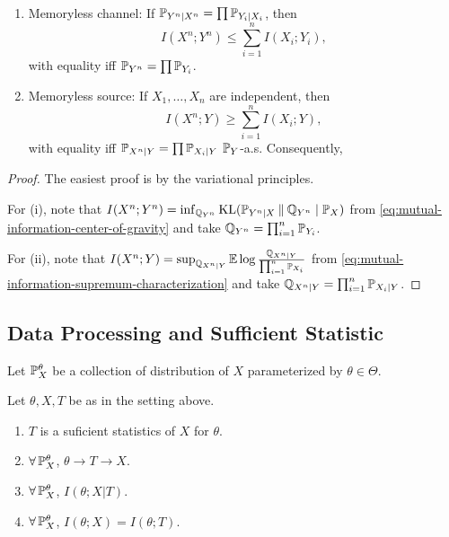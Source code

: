 \begin{theorem}
    \
    \begin{enumerate}[label=(\roman*)]
        \item Memoryless channel: If $\mathbb{P}_{Y^n|X^n}=\prod \mathbb{P}_{Y_i|X_i}$, then 
        \[I(X^n;Y^n)\leq \sum_{i=1}^{n}I(X_i;Y_i),\]
        with equality iff $\mathbb{P}_{Y^n}=\prod \mathbb{P}_{Y_i}$.
        \item Memoryless source: If $X_1,\dots,X_n$ are independent, then \[I(X^n;Y)\geq \sum_{i=1}^{n}I(X_i;Y),\]
        with equality iff $\mathbb{P}_{X^n|Y}=\prod \mathbb{P}_{X_i|Y}$ $\mathbb{P}_Y$-a.s. 
        Consequently,
    \end{enumerate}
\end{theorem}
\begin{proof}
    The easiest proof is by the variational principles.

    For (i), note that $I(X^n;Y^n)=\inf_{\mathbb{Q}_{Y^n}}\operatorname{KL}(\mathbb{P}_{Y^n|X}\mathbin{\|}\mathbb{Q}_{Y^n}\mid\mathbb{P}_X)$ from \eqref{eq:mutual-information-center-of-gravity} and take $\mathbb{Q}_{Y^n}=\prod_{i=1}^{n}\mathbb{P}_{Y_i}$.
    
    For (ii), note that $I(X^n;Y)=\sup_{\mathbb{Q}_{X^n|Y}}\mathbb{E}\log \frac{\mathbb{Q}_{X^n|Y}}{\prod_{i=1}^{n}\mathbb{P}_{X_i}}$ from \eqref{eq:mutual-information-supremum-characterization} and take $\mathbb{Q}_{X^n|Y}=\prod_{i=1}^{n}\mathbb{P}_{X_i|Y}$. 
\end{proof}

\subsection{Data Processing and Sufficient Statistic}

Let $\mathbb{P}_X^\theta$ be a collection of distribution of $X$ parameterized by $\theta\in\Theta$.

\begin{definition}
    
\end{definition}
\begin{theorem}
    Let $\theta,X,T$ be as in the setting above.
    \begin{enumerate}[label=(\roman*)]
        \item $T$ is a suficient statistics of $X$ for $\theta$.
        \item $\forall\, \mathbb{P}^\theta_X$, $\theta\to T\to X$.
        \item $\forall\, \mathbb{P}^\theta_X$, $I(\theta;X|T)$.
        \item $\forall\, \mathbb{P}^\theta_X$, $I(\theta;X)=I(\theta;T)$.
    \end{enumerate}
\end{theorem}

